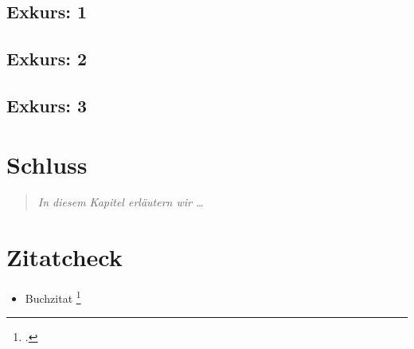 \documentclass[
  DIV=calc,
  BCOR=5mm,
  11pt,
  headings=small,
  oneside,
  abstract=true,
  toc=bib,
  english,ngerman]{scrbook}
\begin{document}
\section{Exkurs: 1}

\section{Exkurs: 2}

\section{Exkurs: 3}

\chapter{Schluss}
\begin{quote}\itshape
In diesem Kapitel erläutern wir \ldots
\end{quote}


\chapter{Zitatcheck}
\begin{itemize}
  \item Buchzitat \footcite[vgl.][15]{AllHen2008a}
\end{itemize}

\small




\printnomenclature


\end{document}
